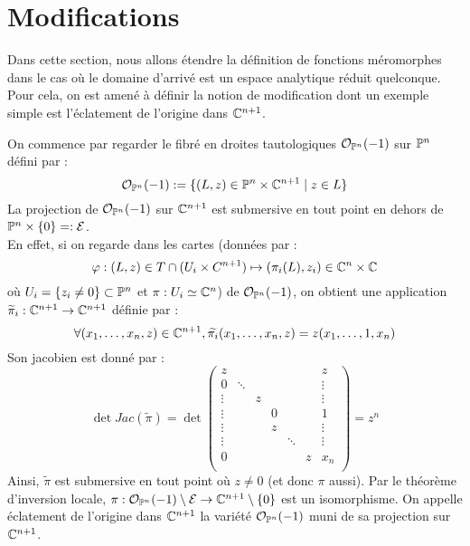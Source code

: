 \documentclass[a4page,10pt]{article}
\begin{document}

\fi
\section{Modifications}
\label{Modif}
Dans cette section, nous allons \'etendre la d\'efinition de fonctions m\'eromorphes dans le cas o\`u le domaine d'arriv\'e est un espace analytique r\'eduit quelconque. Pour cela, on est amen\'e \`a d\'efinir la notion de modification dont un exemple simple est l'\'eclatement de l'origine dans $\C^{n+1}$.
\begin{Ex}
On commence par regarder le fibr\'e en droites tautologiques $ \Ocal_{\P^n}(-1)$ sur $\P^n$ d\'efini par :
\[ \Ocal_{\P^n}(-1):= \{ (L,z) \in \P^n\times \C^{n+1} \mid z \in L \}
\]
La projection de $\Ocal_{\P^n}(-1)$ sur $\C^{n+1}$ est submersive en tout point en dehors de $\P^n\times\{0\}=:\Ecal$. \\
En effet, si on regarde dans les cartes (donn\'ees par :
    \[\varphi :(L,z) \in T \cap (U_i \times C^{n+1}) \mapsto (\pi_i(L),z_i)\in \C^n \times \C
\]
 o\`u $U_i=\{z_i \neq 0\} \subset \P^n$ et $\pi : U_i \simeq \C^n$)
de $\Ocal_{\P^n}(-1)$, on obtient une application $\widetilde{\pi}_i : \C^{n+1} \to \C^{n+1}$ d\'efinie par :
\[  \forall (x_1,\ldots,x_n,z) \in \C^{n+1}, \widetilde{\pi_i}(x_1,\ldots,x_n,z)=z(x_1,\ldots,1,x_n)
\]
Son jacobien est donn\'e par :
\[
 \det Jac(\widetilde{\pi})=\det\begin{pmatrix}
    z&&&&&&z \\
    0&\ddots&&&&&\vdots\\
    \vdots&&z&&&&\vdots\\
    \vdots&&&0&&&1\\
    \vdots&&&z&&&\vdots\\
    \vdots&&&&\ddots&&\vdots\\
    0&&&&&z&x_n\\
    \end{pmatrix}=z^n
  \]
  Ainsi, $\widetilde{\pi}$ est submersive en tout point o\`u $z \neq 0$ (et donc $\pi$ aussi).
  Par le th\'eor\`eme d'inversion locale, $\pi : \Ocal_{\P^n}(-1)\setminus \Ecal \to \C^{n+1} \setminus \{0\}$ est un isomorphisme. On appelle \'eclatement de l'origine dans $\C^{n+1}$ la vari\'et\'e $\Ocal_{\P^n}(-1)$ muni de sa projection sur $\C^{n+1}$.
\end{Ex}
\end{document}

